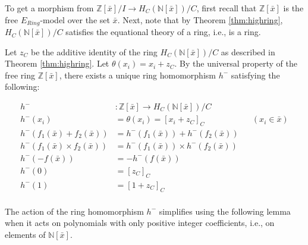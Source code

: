 \documentclass{msthesis}
\theoremstyle{definition}
\newcommand{\ints}{\mathbb{Z}}
\newcommand{\nat}{\mathbb{N}}
\begin{document}
To get a morphism from $\ints[\bar{x}]/I \to H_C(\nat[\bar{x}])/C$, first recall that $\ints[\bar{x}]$ is the free $E_{Ring}$-model over the set $\bar{x}$.  Next, note that by Theorem \ref{thm:highring}, $H_C(\nat[\bar{x}])/C$ satisfies the equational theory of a ring, i.e., is a ring.  

Let $z_C$ be the additive identity of the ring $H_C(\nat[\bar{x}])/C$ as described in Theorem \ref{thm:highring}. Let $\theta(x_i) = x_i + z_C$.  By the universal property of the free ring $\ints[\bar{x}]$, there exists a unique ring homomorphism $h^-$ satisfying the following:

\begin{align*}
    h^- &: \ints[\bar{x}] \to H_C(\nat[\bar{x}])/C \\
    h^-(x_i) &=\theta(x_i) = [x_i + z_C]_C && (x_i \in \bar{x}) \\
    h^-(f_1(\bar{x})+f_2(\bar{x})) &= h^-(f_1(\bar{x})) + h^-(f_2(\bar{x})) \\
    h^-(f_1(\bar{x})\times f_2(\bar{x})) &= h^-(f_1(\bar{x})) \times h^-(f_2(\bar{x})) \\
    h^-(-f(\bar{x})) &= -h^-(f(\bar{x})) \\
    h^-(0) &= [z_C]_C \\
    h^-(1) &= [1 + z_C]_C \\
\end{align*}

The action of the ring homomorphism $h^-$ simplifies using the following lemma when it acts on polynomials with only positive integer coefficients, i.e., on elements of $\nat[\bar{x}]$.
\end{document}
